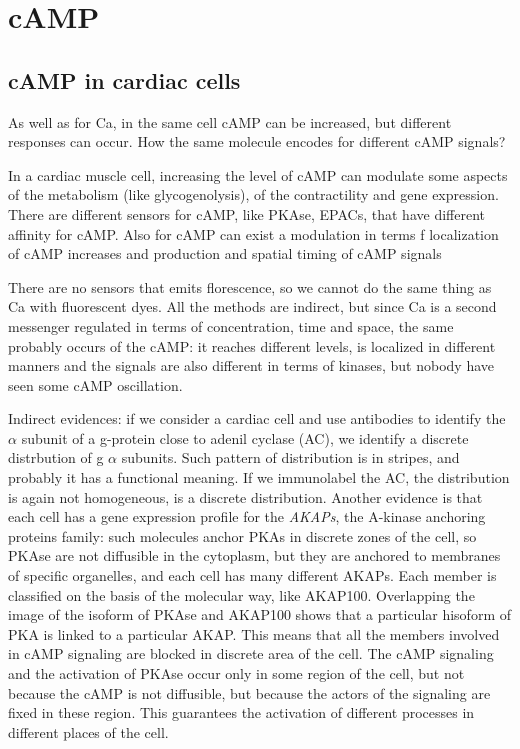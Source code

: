 \documentclass[a4paper, 12pt]{book}
\begin{document}
\chapter{cAMP}
\section{cAMP in cardiac cells}
As well as for Ca, in the same cell cAMP can be increased, but different responses can occur. How the same molecule encodes for different cAMP signals?

In a cardiac muscle cell, increasing the level of cAMP can modulate some aspects of the metabolism (like glycogenolysis), of the contractility and gene expression. There are different sensors for cAMP, like PKAse, EPACs, that have different affinity for cAMP. Also for cAMP can exist a modulation in terms f localization of cAMP increases and production and spatial timing of cAMP signals

There are no sensors that emits florescence, so we cannot do the same thing as Ca with fluorescent dyes. All the methods are indirect, but since Ca is a second messenger regulated in terms of concentration, time and space, the same probably occurs of the cAMP: it reaches different levels, is localized in different manners and the signals are also different in terms of kinases, but nobody have seen some cAMP oscillation.

Indirect evidences: if we consider a cardiac cell and use antibodies to identify the $\alpha$ subunit of a g-protein close to adenil cyclase (AC), we identify a discrete distrbution of g $\alpha$ subunits. Such pattern of distribution is in stripes, and probably it has a functional meaning. If we immunolabel the AC, the distribution is again not homogeneous, is a discrete distribution. Another evidence is that each cell has a gene expression profile for the \emph{AKAPs}, the A-kinase anchoring proteins family: such molecules anchor PKAs in discrete zones of the cell, so PKAse are not diffusible in the cytoplasm, but they are anchored to membranes of specific organelles, and each cell has many different AKAPs. Each member is classified on the basis of the molecular way, like AKAP100. Overlapping the image of the isoform of PKAse and AKAP100 shows that a particular hisoform of PKA is linked to a particular AKAP.
This means that all the members involved in cAMP signaling are blocked in discrete area of the cell. The cAMP signaling and the activation of PKAse occur only in some region of the cell, but not because the cAMP is not diffusible, but because the actors of the signaling are fixed in these region. This guarantees the activation of different processes in different places of the cell.
\end{document}
